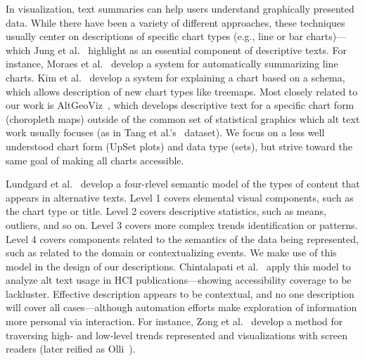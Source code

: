 \documentclass{egpubl}
\newcommand{\etal}{et al.}
\newcommand{\etals}{et al.'s}
\newcommand{\eg}{{e.g.,}}
\begin{document}
In visualization, text summaries can help users understand graphically presented data.
While there have been a variety of different approaches, these techniques usually center on descriptions of specific chart types (\eg{} line or bar charts)---which Jung \etal{}~\cite{jung_communicating_2022} highlight as an essential component of descriptive texts.
For instance, Moraes \etal{}~\cite{moraes_evaluating_2014} develop a system for automatically summarizing line charts.
Kim \etal{}~\cite{kim_explain_2023} develop a system for explaining a chart based on a schema, which allows description of new chart types like treemaps.
Most closely related to our work is AltGeoViz~\cite{li_altgeoviz_2024}, which develops descriptive text for a specific chart form (choropleth maps) outside of the common set of statistical graphics which alt text work usually focuses (as in Tang \etals{}~\cite{tang_vistext_2023} dataset).
We focus on a less well understood chart form (UpSet plots) and data type (sets), but strive toward the same goal of making all charts accessible.


Lundgard \etal{}~\cite{lundgard_accessible_2022} develop a four-rlevel semantic model of the types of content that appears in alternative texts.
Level 1 covers elemental visual components, such as the chart type or title.
Level 2 covers descriptive statistics, such as means, outliers, and so on.
Level 3 covers more complex trends identification or patterns.
Level 4 covers components related to the semantics of the data being represented, such as related to the domain or contextualizing events.
We make use of this model in the design of our descriptions.
Chintalapati \etal{}~\cite{chintalapati_dataset_2022} apply this model to analyze alt text usage in HCI publications---showing accessibility coverage to be lackluster.
Effective description appears to be contextual, and no one description will cover all cases---although automation efforts make exploration of information more personal via interaction.
For instance, Zong \etal{}~\cite{zong_rich_2022} develop a method for traversing high- and low-level trends represented and visualizations with screen readers (later reified as Olli~\cite{blanco_olli}).
\end{document}
